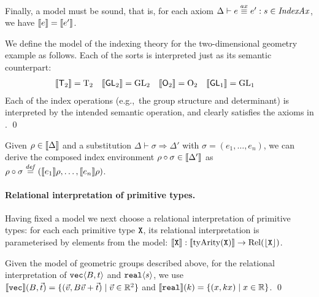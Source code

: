 Finally, a model
must be sound, that is, for each axiom $\Delta \vdash e \stackrel{ax}\equiv e' : s \in
\mathit{IndexAx}$, we have $\llbracket e \rrbracket = \llbracket e' \rrbracket$. 

\begin{example*}
We define the model
of the indexing theory for the two-dimensional
geometry example as follows. Each of the sorts is interpreted just as
its semantic counterpart: 
\begin{align*}
\llbracket \mathsf{T}_2 \rrbracket & = \mathrm{T}_2
&\llbracket \mathsf{GL}_2 \rrbracket & = \mathrm{GL}_2 &
\llbracket \mathsf{O}_2 \rrbracket & = \mathrm{O}_2
&\llbracket \mathsf{GL}_1 \rrbracket & = \mathrm{GL}_1
\end{align*}
Each of the index operations (e.g.,~the group structure and
determinant) is interpreted by the intended semantic operation, and
clearly satisfies the axioms in . 
\qed
\end{example*}

Given $\rho \in \llbracket \Delta \rrbracket$ and a substitution
$\Delta \vdash \sigma \Rightarrow \Delta'$ with $\sigma = (e_1,\ldots,e_n)$, 
we can derive the composed
index environment $\rho \circ \sigma
\in \llbracket \Delta' \rrbracket$ as $\rho \circ \sigma \stackrel{\mathit{def}}= (\llbracket e_1 \rrbracket\rho,\ldots,\llbracket e_n \rrbracket\rho)$.


\paragraph{Relational interpretation of primitive types.}
Having fixed a model
we next choose a relational interpretation 
of
primitive types: for each each primitive type
$\textup{\texttt{X}}$, its relational interpretation is parameterised by elements
from the model: $\llbracket \textup{\texttt{X}} \rrbracket :
\llbracket \mathrm{tyArity}(\textup{\texttt{X}}) \rrbracket \to \mathrm{Rel}(\left\lfloor \textup{\texttt{X}} \right\rfloor)$. 

\begin{example*}
Given the model of geometric groups described above,
for the relational interpretation  of $\textup{\texttt{vec}}\langle B,t \rangle$ and
$\textup{\texttt{real}}\langle s \rangle$, we use $\llbracket \textup{\texttt{vec}} \rrbracket(B,\vec{t}) = \{
(\vec{v}, B\vec{v} + \vec{t}) \mathrel| \vec{v} \in \mathbb{R}^2 \}$ and
$\llbracket \textup{\texttt{real}} \rrbracket(k) = \{ (x, kx) \mathrel| x \in \mathbb{R} \}$.
\qed
\end{example*}

